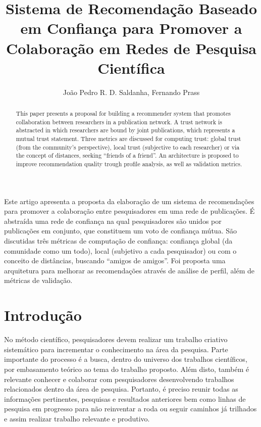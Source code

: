 \documentclass[12pt]{article}
\title{Sistema de Recomendação Baseado em Confiança para Promover a Colaboração em Redes de Pesquisa Científica}
\author{João Pedro R. D. Saldanha\inst{1}, Fernando Prass\inst{1}}
\begin{document}
 

\maketitle

\begin{abstract}
  This paper presents a proposal for building a recommender system that promotes collaboration between researchers in a 
  publication network. A trust network is abstracted in which researchers are bound by joint publications, which represents 
  a mutual trust statement. Three metrics are discussed for  computing trust: global trust (from the community’s perspective), 
  local trust (subjective to each researcher) or via the concept of distances, seeking “friends of a friend”. An architecture 
  is proposed to improve recommendation quality trough profile analysis, as well as validation metrics.
\end{abstract}
     
\begin{resumo} 
  Este artigo apresenta a proposta da elaboração de um sistema de recomendações para promover a colaboração entre pesquisadores 
  em uma rede de publicações. É abstraída uma rede de confiança na qual pesquisadores são unidos por publicações em conjunto, 
  que constituem um voto de confiança mútua. São discutidas três métricas de computação de confiança: confiança global (da 
  comunidade como um todo), local (subjetivo a cada pesquisador) ou com o conceito de distâncias, buscando “amigos de amigos”. 
  Foi proposta uma arquitetura para melhorar as recomendações através de análise  de perfil, além de métricas de validação.
\end{resumo}


\section{Introdução}

No método científico, pesquisadores devem realizar um trabalho criativo sistemático para incrementar 
o conhecimento na área da pesquisa. Parte importante do processo é a busca, dentro do universo dos 
trabalhos científicos, por embasamento teórico ao tema do trabalho proposto. Além disto, também é 
relevante conhecer e colaborar com pesquisadores desenvolvendo trabalhos relacionados dentro da 
área de pesquisa.  Portanto, é preciso reunir todas as informações pertinentes, pesquisas e resultados 
anteriores bem como linhas de pesquisa em progresso para não reinventar a roda ou seguir caminhos já 
trilhados e assim realizar trabalho relevante e produtivo.
\end{document}
